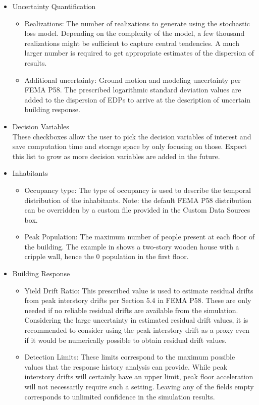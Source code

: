 \begin{itemize}
    \item Uncertainty Quantification
    \begin{itemize}
        \item Realizations: The number of realizations to generate using the stochastic loss model. Depending on the complexity of the model, a few thousand realizations might be sufficient to capture central tendencies. A much larger number is required to get appropriate estimates of the dispersion of results.
        \item Additional uncertainty: Ground motion and modeling uncertainty per FEMA P58. The prescribed logarithmic standard deviation values are added to the dispersion of EDPs to arrive at the description of uncertain building response.
    \end{itemize}
    \item Decision Variables\\
    These checkboxes allow the user to pick the decision variables of interest and save computation time and storage space by only focusing on those. Expect this list to grow as more decision variables are added in the future.
    \item Inhabitants
    \begin{itemize}
        \item Occupancy type: The type of occupancy is used to describe the temporal distribution of the inhabitants. Note: the default FEMA P58 distribution can be overridden by a custom file provided in the Custom Data Sources box.
        \item Peak Population: The maximum number of people present at each floor of the building. The example in  shows a two-story wooden house with a cripple wall, hence the 0 population in the first floor.
    \end{itemize}
    \item Building Response
    \begin{itemize}
        \item Yield Drift Ratio: This prescribed value is used to estimate residual drifts from peak interstory drifts per Section 5.4 in FEMA P58. These are only needed if no reliable residual drifts are available from the simulation. Considering the large uncertainty in estimated residual drift values, it is recommended to consider using the peak interstory drift as a proxy even if it would be numerically possible to obtain residual drift values.
        \item Detection Limits: These limits correspond to the maximum possible values that the response history analysis can provide. While peak interstory drifts will certainly have an upper limit, peak floor acceleration will not necessarily require such a setting. Leaving any of the fields empty corresponds to unlimited confidence in the simulation results.\\

\end{itemize}
\end{itemize}
